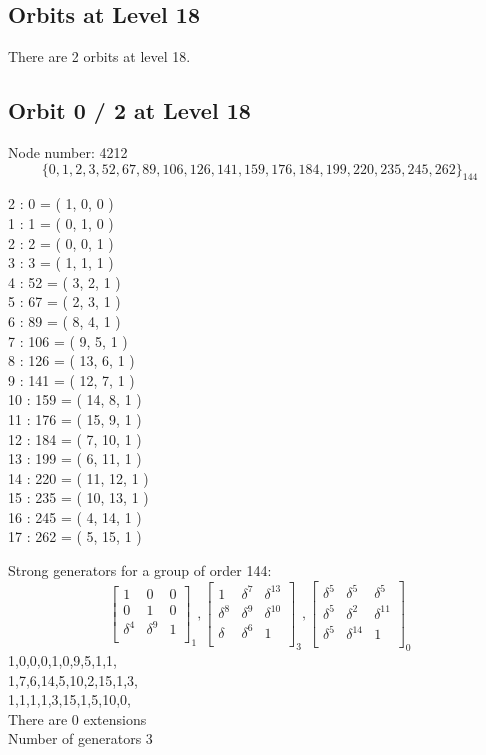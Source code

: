 \subsection*{Orbits at Level 18}

There are 2 orbits at level 18.\\
\bigskip
\subsection*{Orbit 0 / 2 at Level 18}
Node number: 4212\\
$$
\{ 0, 1, 2, 3, 52, 67, 89, 106, 126, 141, 159, 176, 184, 199, 220, 235, 245, 262 \}_{144}$$
\begin{multicols}{2}
 : 0 = ( 1, 0, 0 )\\
1 : 1 = ( 0, 1, 0 )\\
2 : 2 = ( 0, 0, 1 )\\
3 : 3 = ( 1, 1, 1 )\\
4 : 52 = ( 3, 2, 1 )\\
5 : 67 = ( 2, 3, 1 )\\
6 : 89 = ( 8, 4, 1 )\\
7 : 106 = ( 9, 5, 1 )\\
8 : 126 = ( 13, 6, 1 )\\
9 : 141 = ( 12, 7, 1 )\\
10 : 159 = ( 14, 8, 1 )\\
11 : 176 = ( 15, 9, 1 )\\
12 : 184 = ( 7, 10, 1 )\\
13 : 199 = ( 6, 11, 1 )\\
14 : 220 = ( 11, 12, 1 )\\
15 : 235 = ( 10, 13, 1 )\\
16 : 245 = ( 4, 14, 1 )\\
17 : 262 = ( 5, 15, 1 )\\
\end{multicols}
{\small\arraycolsep=2pt
Strong generators for a group of order 144:
$$
\left[
\begin{array}{*{3}{r}}
1 & 0 & 0\\
0 & 1 & 0\\
\delta^{4} & \delta^{9} & 1\\
\end{array}
\right]
_{1}
,
\left[
\begin{array}{*{3}{r}}
1 & \delta^{7} & \delta^{13}\\
\delta^{8} & \delta^{9} & \delta^{10}\\
\delta  & \delta^{6} & 1\\
\end{array}
\right]
_{3}
,
\left[
\begin{array}{*{3}{r}}
\delta^{5} & \delta^{5} & \delta^{5}\\
\delta^{5} & \delta^{2} & \delta^{11}\\
\delta^{5} & \delta^{14} & 1\\
\end{array}
\right]
_{0}
$$
1,0,0,0,1,0,9,5,1,1,\\
1,7,6,14,5,10,2,15,1,3,\\
1,1,1,1,3,15,1,5,10,0,\\
}
There are 0 extensions\\
Number of generators 3\\
